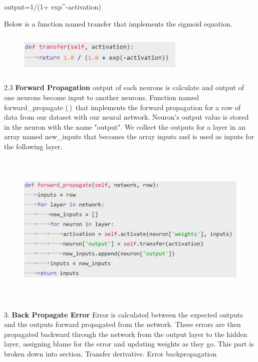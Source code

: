 {output=1/(1+ exp^{-activation})

Below is a function named transfer that implements the sigmoid equation.

\begin{figure}[H]
\begin{center}
\includegraphics[width=80mm,height=20mm]{backexplain/transfer.jpg}
\end{center}
     
\end{figure} 

2.3 \textbf{Forward Propagation}
output of each neurons is calculate and output of one neurons become input to another neurons.\newline
Function named forward\_propagate (\,)\, that implements the forward propagation for a row of data from our dataset with our neural network.
Neuron’s output value is stored in the neuron with the name "output". We collect the outputs for a layer in an array named new\_inputs that becomes the array inputs and is used as inputs for the following layer.

\begin{figure}[H]
\begin{center}
\includegraphics[width=160mm,height=75mm]{backexplain/forward.jpg}
\end{center}
\end{figure} 

3. \textbf{Back Propagate Error}\newline
Error is calculated between the expected outputs and the outputs forward propagated from the network. These errors are then propagated backward through the network from the output layer to the hidden layer, assigning blame for the error and updating weights as they go.\newline
 This part is broken down into section. Transfer derivative. Error backpropagation
 
}
